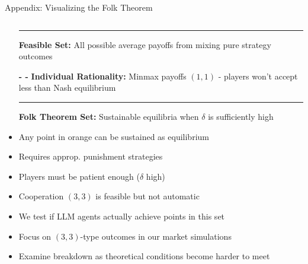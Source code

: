 \documentclass[10pt, aspectratio=169]{beamer}
\begin{document}
\begin{frame}{Appendix: Visualizing the Folk Theorem}
\begin{columns}[T]
    \begin{column}{0.45\textwidth}
        \small
        \begin{itemize}
                \item[\textcolor{gray!60}{\rule{0.3cm}{0.3cm}}] \textbf{Feasible Set:} All possible average payoffs from mixing pure strategy outcomes
                \item[\textbf{- -}] \textbf{Individual Rationality:} Minmax payoffs $(1,1)$ - players won't accept less than Nash equilibrium
                \item[\textcolor{orange}{\rule{0.3cm}{0.3cm}}] \textbf{Folk Theorem Set:} Sustainable equilibria when $\delta$ is sufficiently high
                \item Any point in orange can be sustained as equilibrium
                \item Requires approp. punishment strategies
                \item Players must be patient enough ($\delta$ high)
                \item Cooperation $(3,3)$ is feasible but not automatic
                \item We test if LLM agents actually achieve points in this set
                \item Focus on $(3,3)$-type outcomes in our market simulations
                \item Examine breakdown as theoretical conditions become harder to meet
        \end{itemize}
    \end{column}
    \end{columns}
\end{frame}
\end{document}
